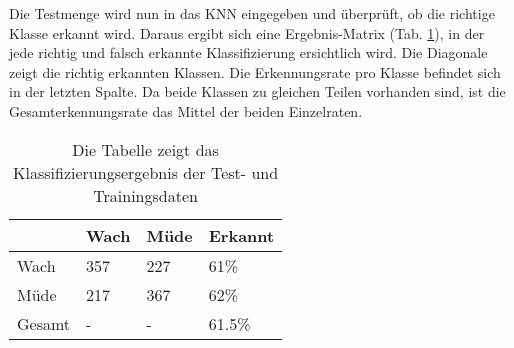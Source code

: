 Die Testmenge wird nun in das KNN eingegeben und überprüft, ob die richtige Klasse erkannt wird. Daraus ergibt sich eine Ergebnis-Matrix (Tab. \ref{tab:ann_results}), in der jede richtig und falsch erkannte Klassifizierung ersichtlich wird. Die Diagonale zeigt die richtig erkannten Klassen. Die Erkennungsrate pro Klasse befindet sich in der letzten Spalte. Da beide Klassen zu gleichen Teilen vorhanden sind, ist die  Gesamterkennungsrate das Mittel der beiden Einzelraten.

\begin{table}[ht]
 \centering
 \caption[KNN Ergebnis-Matrix]{Die Tabelle zeigt das Klassifizierungsergebnis der Test- und Trainingsdaten \label{tab:ann_results}}
 \begin{tabular}{l|lll}
   & Wach & Müde & Erkannt \\ \hline
  Wach & 357 & 227 & 61\%\\  
  Müde & 217 & 367 & 62\%\\ 
  Gesamt & - & - & 61.5\%\\ 
 \end{tabular}
\end{table}